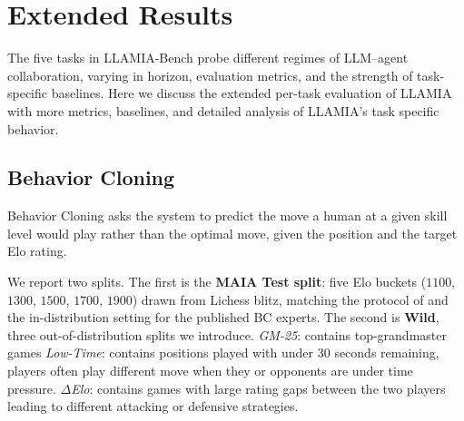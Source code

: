 \newpage
\section{Extended Results}
\label{sec:app_results}
The five tasks in LLAMIA-Bench probe different regimes of LLM–agent collaboration, varying in horizon, evaluation metrics, and the strength of task-specific baselines. Here we discuss the extended per-task evaluation of LLAMIA with more metrics, baselines, and detailed analysis of LLAMIA's task specific behavior.


\subsection{Behavior Cloning}
\label{sec:app_results_bc}
Behavior Cloning asks the system to predict the move a human at a given skill level would play rather than the optimal move, given the position and the target Elo rating.

We report two splits. The first is the \textbf{MAIA Test split}: five Elo buckets ($1100$, $1300$, $1500$, $1700$, $1900$) drawn from Lichess blitz, matching the protocol of \citet{mcilroy2020aligning} and the in-distribution setting for the published BC experts.
The second is \textbf{Wild}, three out-of-distribution splits we introduce.
 \textit{GM-25}: contains top-grandmaster games 
\textit{Low-Time}: contains positions played with under 30 seconds remaining, players often play different move when they or opponents are under time pressure. 
\textit{$\Delta$Elo}: contains games with large rating gaps between the two players leading to different attacking or defensive strategies.

